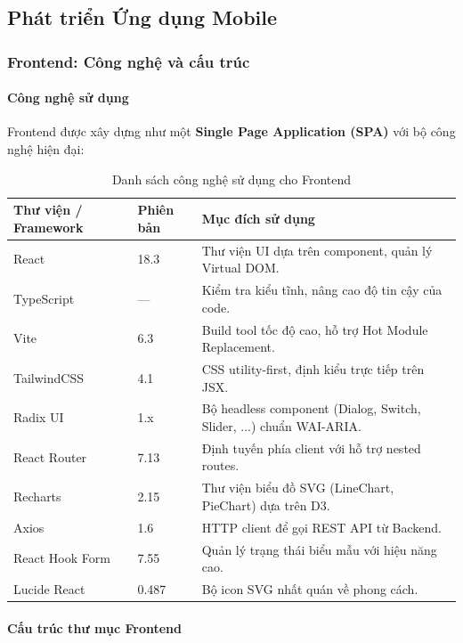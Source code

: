 \subsection{Phát triển Ứng dụng Mobile}

\subsubsection{Frontend: Công nghệ và cấu trúc}

\paragraph{Công nghệ sử dụng}

Frontend được xây dựng như một \textbf{Single Page Application (SPA)} với bộ công nghệ hiện đại:

\begin{table}[H]
\centering
\caption{Danh sách công nghệ sử dụng cho Frontend}
\begin{tabular}{|l|l|p{6.5cm}|}
\hline
\textbf{Thư viện / Framework} & \textbf{Phiên bản} & \textbf{Mục đích sử dụng} \\ \hline
React & 18.3 & Thư viện UI dựa trên component, quản lý Virtual DOM. \\ \hline
TypeScript & --- & Kiểm tra kiểu tĩnh, nâng cao độ tin cậy của code. \\ \hline
Vite & 6.3 & Build tool tốc độ cao, hỗ trợ Hot Module Replacement. \\ \hline
TailwindCSS & 4.1 & CSS utility-first, định kiểu trực tiếp trên JSX. \\ \hline
Radix UI & 1.x & Bộ headless component (Dialog, Switch, Slider, ...) chuẩn WAI-ARIA. \\ \hline
React Router & 7.13 & Định tuyến phía client với hỗ trợ nested routes. \\ \hline
Recharts & 2.15 & Thư viện biểu đồ SVG (LineChart, PieChart) dựa trên D3. \\ \hline
Axios & 1.6 & HTTP client để gọi REST API từ Backend. \\ \hline
React Hook Form & 7.55 & Quản lý trạng thái biểu mẫu với hiệu năng cao. \\ \hline
Lucide React & 0.487 & Bộ icon SVG nhất quán về phong cách. \\ \hline
\end{tabular}
\end{table}

\paragraph{Cấu trúc thư mục Frontend}

